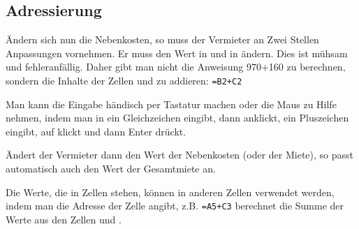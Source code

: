 \subsection{Adressierung}
\begin{minipage}{\textwidth}
\end{minipage}

\medskip

Ändern sich nun die Nebenkosten, so muss der Vermieter an Zwei Stellen Anpassungen vornehmen. Er muss den Wert in  und in  ändern. Dies ist mühsam und fehleranfällig. Daher gibt man \Calc nicht die Anweisung 970+160 zu berechnen, sondern die Inhalte der Zellen  und  zu addieren: \lstinline|=B2+C2|

Man kann die Eingabe händisch per Tastatur machen oder die Maus zu Hilfe nehmen, indem man in  ein Gleichzeichen eingibt, dann  anklickt, ein Pluszeichen eingibt, auf  klickt und dann Enter drückt.

Ändert der Vermieter dann den Wert der Nebenkosten (oder der Miete), so passt \Calc automatisch auch den Wert der Gesamtmiete an.
\begin{tcolorbox}[title=Adressierung]
    Die Werte, die in Zellen stehen, können in anderen Zellen verwendet werden, indem man die Adresse der Zelle angibt, z.B. \lstinline|=A5+C3| berechnet die Summe der Werte aus den Zellen  und .
\end{tcolorbox}

